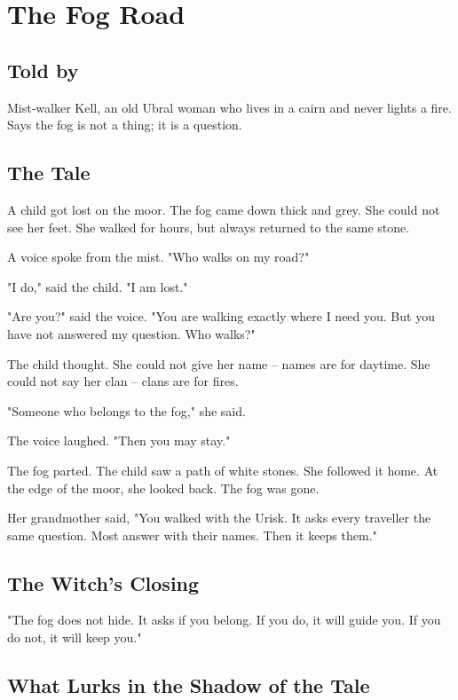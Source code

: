 \chapter{The Fog Road}

\section*{Told by}
Mist‑walker Kell, an old Ubral woman who lives in a cairn and never lights a fire. Says the fog is not a thing; it is a question.

\section*{The Tale}

A child got lost on the moor. The fog came down thick and grey. She could not see her feet. She walked for hours, but always returned to the same stone.

A voice spoke from the mist. "Who walks on my road?"

"I do," said the child. "I am lost."

"Are you?" said the voice. "You are walking exactly where I need you. But you have not answered my question. Who walks?"

The child thought. She could not give her name -- names are for daytime. She could not say her clan -- clans are for fires.

"Someone who belongs to the fog," she said.

The voice laughed. "Then you may stay."

The fog parted. The child saw a path of white stones. She followed it home. At the edge of the moor, she looked back. The fog was gone.

Her grandmother said, "You walked with the Urisk. It asks every traveller the same question. Most answer with their names. Then it keeps them."

\section*{The Witch's Closing}
"The fog does not hide. It asks if you belong. If you do, it will guide you. If you do not, it will keep you."

\section*{What Lurks in the Shadow of the Tale}

